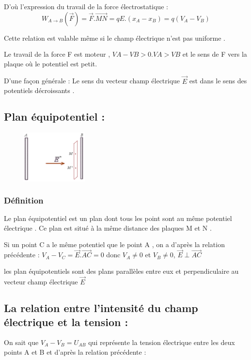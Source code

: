 \documentclass[12pt]{article}
\begin{document}
D’où l’expression du travail de la force électrostatique :
$$W_{A\rightarrow B}(\vec{F}) = \vec{F}.\vec{MN} = qE.(x_A - x_B) = q(V_A - V_B) $$


\begin{tcolorbox}[colback=black!15!white,
                  colframe=black!10!black,
                  title=Remarque :
                 ]
Cette relation est valable même si le champ électrique n’est pas
uniforme .
 
Le travail de la force F est moteur ,
$VA - VB > 0 . VA > VB$ et le sens de F vers la plaque où le
potentiel est petit.
  \tcblower

D’une façon générale :
  Le sens du vecteur champ électrique $\vec{E}$ est dans le sens des
potentiels décroissants .
\end{tcolorbox}

\subsection{Plan équipotentiel :}
\begin{figure}
  \vspace{-1cm}
    \includegraphics[width=0.3\textwidth]{./img/img_01.png}
\end{figure}


\subsubsection{Définition}
Le plan équipotentiel est un plan dont tous les point sont au
même potentiel électrique . Ce plan est situé à la même distance
des plaques M et N .

Si un point C a le même potentiel que le point A , on a d’après la
relation précédente : $V_A - V_C = \vec{E}.\overrightarrow{AC} = 0$
donc $V_A \neq 0$ et $V_B \neq 0$, $\vec{E} \perp \overrightarrow{AC}$ 

les plan équipotentiels sont des plans parallèles entre eux et
perpendiculaire au vecteur champ électrique $\vec{E}$

\subsection{ La relation entre l’intensité du champ électrique et la tension :}
On sait que $V_A - V_B = U_{AB}$ qui représente la tension électrique
entre les deux points A et B et d’après la relation précédente :
\end{document}

